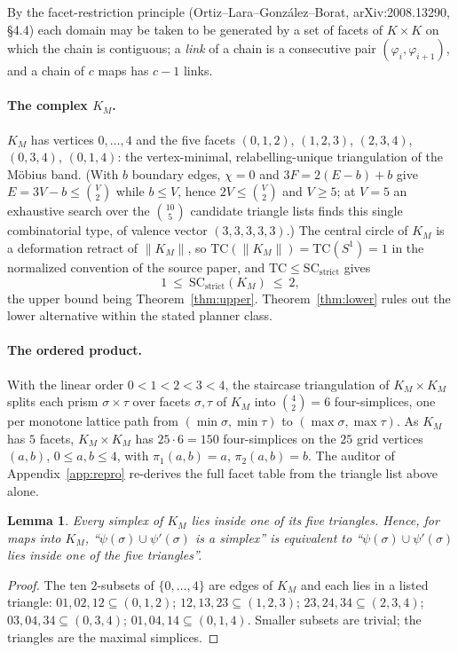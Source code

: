 \documentclass[11pt]{article}
\newtheorem{lemma}[theorem]{Lemma}
\theoremstyle{remark}
\begin{document}
By the facet-restriction principle (Ortiz--Lara--Gonz\'alez--Borat,
arXiv:2008.13290, \S4.4) each domain may be taken to be generated by a set
of facets of $K\times K$ on which the chain is contiguous; a \emph{link}
of a chain is a consecutive pair $(\varphi_i,\varphi_{i+1})$, and a chain
of $c$ maps has $c-1$ links.

\paragraph{The complex $K_M$.}
$K_M$ has vertices $0,\dots,4$ and the five facets
$(0,1,2)$, $(1,2,3)$, $(2,3,4)$, $(0,3,4)$, $(0,1,4)$: the vertex-minimal,
relabelling-unique triangulation of the M\"obius band.  (With $b$ boundary
edges, $\chi=0$ and $3F=2(E-b)+b$ give $E=3V-b\le\binom{V}{2}$ while $b\le
V$, hence $2V\le\binom{V}{2}$ and $V\ge5$; at $V=5$ an exhaustive search
over the $\binom{10}{5}$ candidate triangle lists finds this single
combinatorial type, of valence vector $(3,3,3,3,3)$.)  The central circle
of $K_M$ is a deformation retract of $\|K_M\|$, so
$\mathrm{TC}(\|K_M\|)=\mathrm{TC}(S^1)=1$ in the normalized convention of
the source paper, and $\mathrm{TC}\le\mathrm{SC}_{\mathrm{strict}}$ gives
\begin{equation}
1\ \le\ \mathrm{SC}_{\mathrm{strict}}(K_M)\ \le\ 2,
\label{eq:range}
\end{equation}
the upper bound being Theorem~\ref{thm:upper}.  Theorem~\ref{thm:lower}
rules out the lower alternative within the stated planner class.

\paragraph{The ordered product.}
With the linear order $0<1<2<3<4$, the staircase triangulation of
$K_M\times K_M$ splits each prism $\sigma\times\tau$ over facets
$\sigma,\tau$ of $K_M$ into $\binom42=6$ four-simplices, one per monotone
lattice path from $(\min\sigma,\min\tau)$ to $(\max\sigma,\max\tau)$.  As
$K_M$ has $5$ facets, $K_M\times K_M$ has $25\cdot6=150$ four-simplices on
the $25$ grid vertices $(a,b)$, $0\le a,b\le4$, with
$\pi_1(a,b)=a$, $\pi_2(a,b)=b$.  The auditor of
Appendix~\ref{app:repro} re-derives the full facet table from the triangle
list above alone.

\begin{lemma}\label{lem:simplex}
Every simplex of $K_M$ lies inside one of its five triangles.  Hence, for
maps into $K_M$, ``$\psi(\sigma)\cup\psi'(\sigma)$ is a simplex'' is
equivalent to ``$\psi(\sigma)\cup\psi'(\sigma)$ lies inside one of the five
triangles''.
\end{lemma}
\begin{proof}
The ten $2$-subsets of $\{0,\dots,4\}$ are edges of $K_M$ and each lies in
a listed triangle: $01,02,12\subseteq(0,1,2)$; $12,13,23\subseteq(1,2,3)$;
$23,24,34\subseteq(2,3,4)$; $03,04,34\subseteq(0,3,4)$;
$01,04,14\subseteq(0,1,4)$.  Smaller subsets are trivial; the triangles
are the maximal simplices.
\end{proof}
\end{document}
